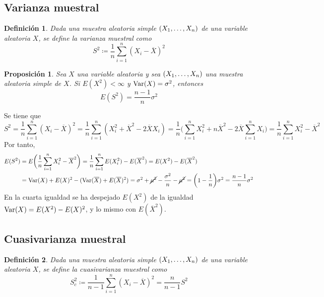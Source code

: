 \documentclass[11pt]{report}
\makeatletter
\renewenvironment{proof}[1][\proofname]{\par
  \pushQED{\qed}%
  \normalfont \topsep\z@skip %
  \trivlist
  \item[\hskip\labelsep
        \itshape
    #1\@addpunct{.}]\ignorespaces
}{%
  \popQED\endtrivlist\@endpefalse
}
\newtheorem{proposition}{Proposición}
\newtheorem{definition}{Definición}
\theoremstyle{definition}
\makeatother
\begin{document}
\subsection{Varianza muestral}

\begin{definition}
Dada una muestra aleatoria simple $(X_1,\mathellipsis,X_n)$ de una variable aleatoria $X$, se define la \emph{varianza muestral} como
\[S^2\coloneqq\frac{1}{n}\sum_{i=1}^n(X_i-\overline{X})^2\]
\end{definition}

\begin{proposition}
\label{prop1.10}
Sea $X$ una variable aleatoria y sea $(X_1,\mathellipsis,X_n)$ una muestra aleatoria simple de $X$. Si 
$E(X^2) < \infty$ y $\textup{Var}(X)=\sigma^2$, entonces
\[E(S^2) = \frac{n-1}{n}\sigma^2\]
\end{proposition}

\begin{proof}
Se tiene que
    \[S^2 = \frac{1}{n}\sum_{i=1}^n(X_i-\overline{X})^2 = \frac{1}{n}\sum_{i=1}^n(X_i^2+\overline{X}^2-2\overline{X}X_i) = \frac{1}{n}\biggl(\sum_{i=1}^n X_i^2+n \overline{X}^2-2\overline{X}\sum_{i=1}^n X_i\biggr) = \frac{1}{n}\sum_{i=1}^n X_i^2-\overline{X}^2\]
    Por tanto,
    \[
    \begin{aligned}[t]
        E(S^2) &= E\biggl(\frac{1}{n}\sum_{i=1}^n X_i^2-\overline{X}^2\biggr) = \frac{1}{n}\sum_{i=1}^nE(X_i^2)-E(\overline{X}^2) = E(X^2)-E(\overline{X}^2) \\
        &= \textup{Var}(X)+E(X)^2-(\textup{Var}(\overline{X})+E(\overline{X})^2) = \sigma^2+\cancel{\mu^2}-\frac{\sigma^2}{n}-\cancel{\mu^2} = \biggl(1-\frac{1}{n}\biggr)\sigma^2 = \frac{n-1}{n}\sigma^2
    \end{aligned}
     \]
En la cuarta igualdad se ha despejado $E(X^2)$ de la igualdad $\textup{Var}(X) = E(X^2)-E(X)^2$, y lo mismo con $E(\overline{X}^2)$.
\end{proof}

\subsection{Cuasivarianza muestral}

\begin{definition}
Dada una muestra aleatoria simple $(X_1,\mathellipsis,X_n)$ de una variable aleatoria $X$, se define la \emph{cuasivarianza muestral} como
\[S^2_c\coloneqq\frac{1}{n-1}\sum_{i=1}^n(X_i-\overline{X})^2=\frac{n}{n-1}S^2\]
\end{definition}
\end{document}
